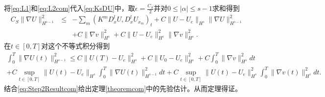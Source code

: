 \documentclass{article}
\begin{document}
将\eqref{eq:L1}和\eqref{eq:L2com}代入\eqref{eq:KsDU}中，取$\epsilon = \frac{C_S}{2}$并对$0 \le |\alpha| \le s-1$求和得到
\begin{eqnarray*}\label{eq:nablaUcom}
  C_S \|\nabla U\|_{H^{s-1}}^2 &\le& - \sum_{m} (K^m D^l_x U,D^l_x U_{x_m})_t  + C\|U-U_e\|_{H^s} \|\nabla U\|_{H^{s-1}}^2 \nonumber \\
  &&+ C \|\nabla  v \|_{H^s}^2+ C \|U-U_e\|_{H^s}^2 \|\nabla  v \|_{H^s}^2 .
\end{eqnarray*}
在$t \in [0,T]$对这个不等式积分得到
\begin{eqnarray*}
  \int_0^T \| \nabla U(t)\|_{H^{s-1}}^2 \le C \|U(T)-U_e \|_{H^s}^2 + C \|U_0 -U_e\|_{H^s}^2+ C\int_0^T \|\nabla  v \|_{H^s}^2 dt  \nonumber \\
  + C \sup_{t \in [0,T]} \|U(t)-U_e\|_{H^s} \int_0^T \|\nabla U(t)\|_{H^{s-1}}^2dt
  + C \sup_{t \in [0,T]} \|U(t)-U_e\|_{H^s}^2 \int_0^T\|\nabla  v (t)\|_{H^s}^2 dt. \nonumber
\end{eqnarray*}
结合\eqref{eq:Step2Resultcom}给出定理\ref{theoremcom}中的先验估计。从而定理得证。






\end{document}
